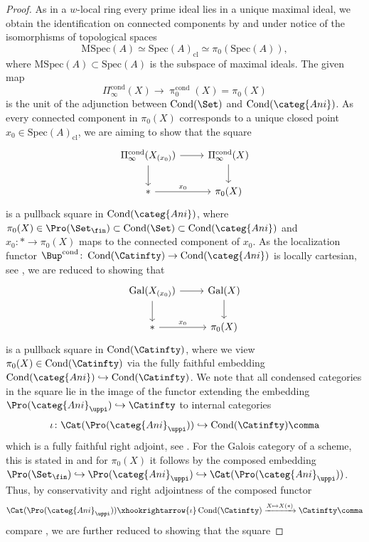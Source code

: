 \documentclass[leqno]{article}
\renewcommand{\Gal}{\mathrm{Gal}}
\newcommand{\Ani}{\categ{Ani}}
\DeclareMathOperator{\Cond}{Cond}
\newcommand{\CondAni}{\Cond(\Ani)}
\newcommand{\CondSet}{\Cond(\Set)}
\newcommand{\CondCat}{\Cond(\Catinfty)}
\DeclareMathOperator{\FinSet}{\Set_{\fin}}
\DeclareMathOperator{\ProFin}{\Pro(\FinSet)}
\newcommand{\cond}{\mathrm{cond}}
\newcommand{\Bcond}{\Bup^{\cond}}
\newcommand{\Picond}{\Pi_{\infty}^{\cond}}
\newcommand{\CondShape}[1]{\Picond(#1)}
\newcommand{\picond}{\uppi^{\cond}}
\newcommand{\pizerocond}{\picond_0}
\newcommand{\Anifin}{\Ani_{\uppi}}
\newcommand{\ProAnifin}{\Pro(\Anifin)}
\renewcommand{\Spec}{\mathrm{Spec}}
\begin{document}
\begin{proof}
  As in a $w$-local ring every prime ideal lies in a unique maximal ideal, we obtain the identification on connected components by \cite[Proposition 4.29]{The_condensed_homotopy_type} and under notice of the isomorphisms of topological spaces $$\mathrm{M}\Spec(A)\simeq\Spec(A)_{\mathrm{cl}}\simeq \pi_0(\Spec(A))\comma $$ where $\mathrm{M}\Spec(A)\subset \Spec(A)$ is the subspace of maximal ideals. The given map $$\CondShape{X} \rightarrow \pizerocond(X)=\pi_0(X)$$ is the unit of the adjunction between $\CondSet$ and $\CondAni$.
As every connected component in $\pi_0(X)$ corresponds to a unique closed point $x_0\in \Spec(A)_{\mathrm{cl}}$, we are aiming to show that the square 
    \[
  \begin{tikzcd}
   \CondShape{X_{(x_0)}}  \arrow[swap]{r} \arrow{d} & \CondShape{X} \arrow{d} \\
     \ast \arrow["x_0"]{r} & \pi_0(X)
  \end{tikzcd}
    \]
is a pullback square in $\CondAni$, where $\pi_0(X)\in \ProFin\subset \CondSet \subset \CondAni$ and $x_0\colon \ast \rightarrow \pi_0(X)$ maps to the connected component of $x_0$. As the localization functor $\Bcond\colon \CondCat \rightarrow \CondAni$ is locally cartesian, see \cite[Example 5.5]{The_condensed_homotopy_type}, we are reduced to showing that 
 \[
  \begin{tikzcd}
   \Gal(X_{(x_0)}) \arrow[swap]{r} \arrow{d} & \Gal(X)\arrow{d} \\
     \ast \arrow["x_0"]{r} & \pi_0(X)
  \end{tikzcd}
    \]
is a pullback square in $\CondCat$, where we view $\pi_0(X)\in \CondCat$ via the fully faithful embedding $\CondAni\hookrightarrow \CondCat$. We note that all condensed categories in the square lie in the image of the functor extending the embedding $\ProAnifin\hookrightarrow \Catinfty$ to internal categories
$$\iota \colon \Cat(\ProAnifin)\hookrightarrow \CondCat\comma$$
which is a fully faithful right adjoint, see \cite[Observation 2.21]{The_condensed_homotopy_type}. For the Galois category of a scheme, this is stated in \cite[Recollection 3.32]{The_condensed_homotopy_type} and for $\pi_0(X)$ it follows by the composed embedding $\ProFin \hookrightarrow \ProAnifin\hookrightarrow \Cat(\ProAnifin)$. Thus, by conservativity and right adjointness of the composed functor
$$\Cat(\ProAnifin) \xhookrightarrow{\iota} \CondCat \xrightarrow{X\mapsto X(\ast)} \Catinfty \comma$$
compare \cite[Observation 6.5]{The_condensed_homotopy_type}, we are further reduced to showing that the square

\end{proof}
\end{document}
